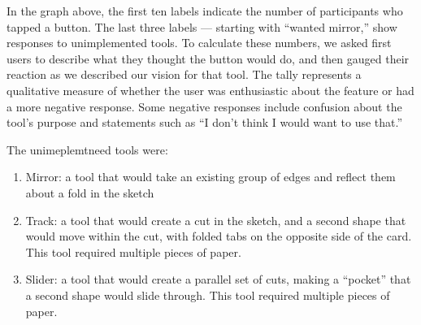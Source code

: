 
In the graph above, the first ten labels indicate the number of
participants who tapped a button. The last three labels --- starting
with ``wanted mirror,'' show responses to unimplemented tools. To
calculate these numbers, we asked first users to describe what they
thought the button would do, and then gauged their reaction as we
described our vision for that tool. The tally represents a qualitative
measure of whether the user was enthusiastic about the feature or had a
more negative response. Some negative responses include confusion about
the tool's purpose and statements such as ``I don't think I would want
to use that.''

The unimeplemtneed tools were:

\begin{enumerate}
\def\labelenumi{\arabic{enumi}.}
\itemsep1pt\parskip0pt
\item
  Mirror: a tool that would take an existing group of edges and reflect
  them about a fold in the sketch
\item
  Track: a tool that would create a cut in the sketch, and a second
  shape that would move within the cut, with folded tabs on the opposite
  side of the card. This tool required multiple pieces of paper.
\item
  Slider: a tool that would create a parallel set of cuts, making a
  ``pocket'' that a second shape would slide through. This tool required
  multiple pieces of paper.
\end{enumerate}

